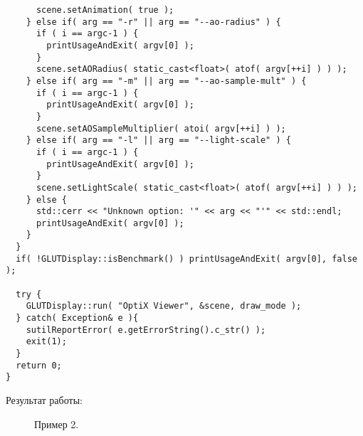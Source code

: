 \begin{verbatim}
      scene.setAnimation( true );
    } else if( arg == "-r" || arg == "--ao-radius" ) {
      if ( i == argc-1 ) {
        printUsageAndExit( argv[0] );
      }
      scene.setAORadius( static_cast<float>( atof( argv[++i] ) ) );
    } else if( arg == "-m" || arg == "--ao-sample-mult" ) {
      if ( i == argc-1 ) {
        printUsageAndExit( argv[0] );
      }
      scene.setAOSampleMultiplier( atoi( argv[++i] ) );
    } else if( arg == "-l" || arg == "--light-scale" ) {
      if ( i == argc-1 ) {
        printUsageAndExit( argv[0] );
      }
      scene.setLightScale( static_cast<float>( atof( argv[++i] ) ) );
    } else {
      std::cerr << "Unknown option: '" << arg << "'" << std::endl;
      printUsageAndExit( argv[0] );
    }
  }  
  if( !GLUTDisplay::isBenchmark() ) printUsageAndExit( argv[0], false );

  try {
    GLUTDisplay::run( "OptiX Viewer", &scene, draw_mode );
  } catch( Exception& e ){
    sutilReportError( e.getErrorString().c_str() );
    exit(1);
  }
  return 0;
}
\end{verbatim}

Результат работы:
\begin{figure}[h!]
\caption{Пример 2.}
\label{map}
\end{figure}